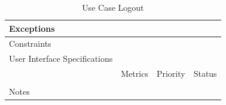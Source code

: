 \begin{table}[H]
\begin{tabularx}{\linewidth}{|l|X|X|X|}
            \hline Exceptions                    & \multicolumn{3}{l|}{}                                                                                 \\

            \hline Constraints                   & \multicolumn{3}{l|}{}                                                                                 \\

            \hline User Interface Specifications & \multicolumn{3}{l|}{}                                                                                 \\

            \hline \multirow{2}{*}{}             & Metrics                                                                           & Priority & Status \\
            \cline{2-4}                          &                                                                                   &          &        \\
            \hline Notes                         & \multicolumn{3}{l|}{}                                                                                 \\
            \hline
      \end{tabularx}
      \caption{Use Case Logout}
      \label{tab:use_case_logout}
\end{table}

